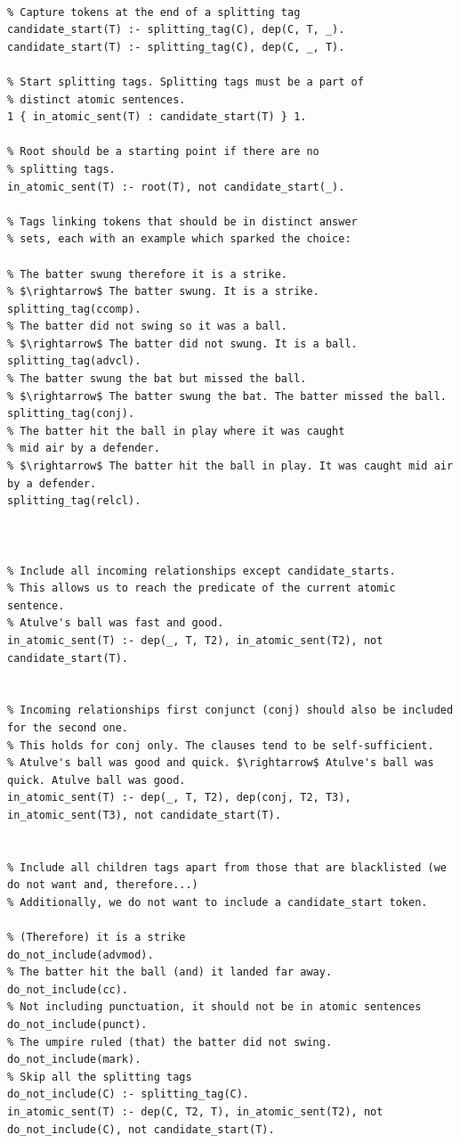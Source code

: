 \begin{lstlisting}

% Capture tokens at the end of a splitting tag
candidate_start(T) :- splitting_tag(C), dep(C, T, _).
candidate_start(T) :- splitting_tag(C), dep(C, _, T).

% Start splitting tags. Splitting tags must be a part of 
% distinct atomic sentences.
1 { in_atomic_sent(T) : candidate_start(T) } 1.

% Root should be a starting point if there are no 
% splitting tags.
in_atomic_sent(T) :- root(T), not candidate_start(_).

% Tags linking tokens that should be in distinct answer 
% sets, each with an example which sparked the choice:

% The batter swung therefore it is a strike.
% $\rightarrow$ The batter swung. It is a strike.
splitting_tag(ccomp).
% The batter did not swing so it was a ball.  
% $\rightarrow$ The batter did not swung. It is a ball.
splitting_tag(advcl).
% The batter swung the bat but missed the ball.
% $\rightarrow$ The batter swung the bat. The batter missed the ball.
splitting_tag(conj).
% The batter hit the ball in play where it was caught 
% mid air by a defender.
% $\rightarrow$ The batter hit the ball in play. It was caught mid air by a defender.
splitting_tag(relcl).



% Include all incoming relationships except candidate_starts. 
% This allows us to reach the predicate of the current atomic sentence.
% Atulve's ball was fast and good.
in_atomic_sent(T) :- dep(_, T, T2), in_atomic_sent(T2), not candidate_start(T).


% Incoming relationships first conjunct (conj) should also be included for the second one.
% This holds for conj only. The clauses tend to be self-sufficient.
% Atulve's ball was good and quick. $\rightarrow$ Atulve's ball was quick. Atulve ball was good.
in_atomic_sent(T) :- dep(_, T, T2), dep(conj, T2, T3), in_atomic_sent(T3), not candidate_start(T).


% Include all children tags apart from those that are blacklisted (we do not want and, therefore...)
% Additionally, we do not want to include a candidate_start token. 

% (Therefore) it is a strike
do_not_include(advmod).
% The batter hit the ball (and) it landed far away.
do_not_include(cc).
% Not including punctuation, it should not be in atomic sentences 
do_not_include(punct).
% The umpire ruled (that) the batter did not swing.
do_not_include(mark).
% Skip all the splitting tags
do_not_include(C) :- splitting_tag(C).
in_atomic_sent(T) :- dep(C, T2, T), in_atomic_sent(T2), not do_not_include(C), not candidate_start(T).


\end{lstlisting}
